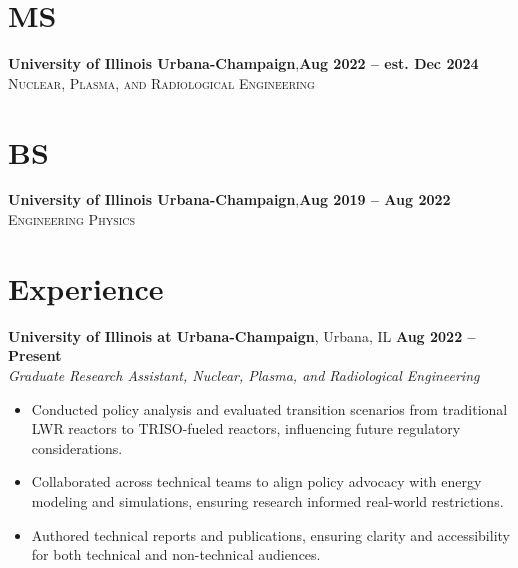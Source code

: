 \documentclass[margin,line]{resume}
\begin{document}
\begin{resume}
    \section{\mysidestyle MS}
    \textbf{University of Illinois Urbana-Champaign},\hfill\textbf{Aug 2022 -- est. Dec 2024}\\
    \textsc{Nuclear, Plasma, and Radiological Engineering}\\
    \vspace{-5.5mm}
    \section{\mysidestyle BS}
    \textbf{University of Illinois Urbana-Champaign},\hfill\textbf{Aug 2019 -- Aug 2022}\\%
    \textsc{Engineering Physics}\\
    \vspace{-5mm}

    \section{\mysidestyle Experience}

    \textbf{University of Illinois at Urbana-Champaign}, Urbana, IL \hfill \textbf{Aug 2022 -- Present} \\
    \textsl{Graduate Research Assistant, Nuclear, Plasma, and Radiological Engineering} \\
    \begin{itemize}
        \item Conducted policy analysis and evaluated transition scenarios from traditional LWR reactors to TRISO-fueled reactors, influencing future regulatory considerations.
        \item Collaborated across technical teams to align policy advocacy with energy modeling and simulations, ensuring research informed real-world restrictions.
        \item Authored technical reports and publications, ensuring clarity and accessibility for both technical and non-technical audiences.
    \end{itemize}


\end{resume}
\end{document}
